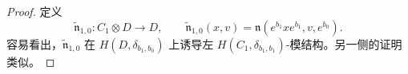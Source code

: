 \begin{proof}
定义
\[
 \widetilde{\mathfrak n}_{1,0}\colon C_1\otimes D\longrightarrow D,
 \qquad
 \widetilde{\mathfrak n}_{1,0}(x,v)
 =
 \mathfrak n(e^{b_1}xe^{b_1},v,e^{b_0}).
\]
容易看出，$\widetilde{\mathfrak n}_{1,0}$ 在
$H(D,\delta_{b_1,b_0})$ 上诱导左
$H(C_1,\delta_{b_1,b_1})$-模结构。另一侧的证明类似。
\end{proof}
